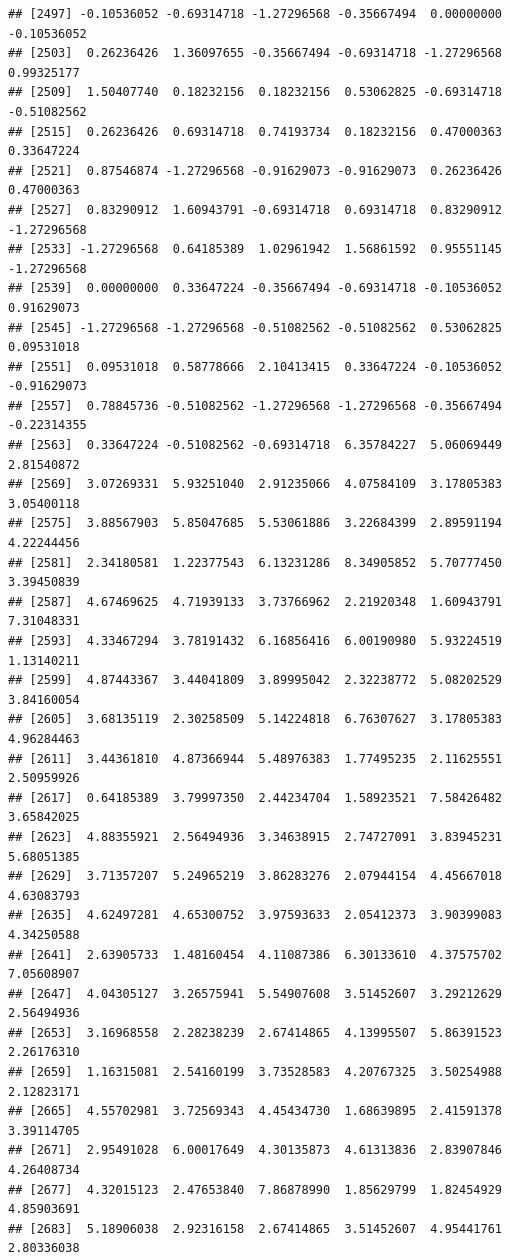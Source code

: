 \documentclass[
]{article}
\begin{document}
\begin{verbatim}
## [2497] -0.10536052 -0.69314718 -1.27296568 -0.35667494  0.00000000 -0.10536052
## [2503]  0.26236426  1.36097655 -0.35667494 -0.69314718 -1.27296568  0.99325177
## [2509]  1.50407740  0.18232156  0.18232156  0.53062825 -0.69314718 -0.51082562
## [2515]  0.26236426  0.69314718  0.74193734  0.18232156  0.47000363  0.33647224
## [2521]  0.87546874 -1.27296568 -0.91629073 -0.91629073  0.26236426  0.47000363
## [2527]  0.83290912  1.60943791 -0.69314718  0.69314718  0.83290912 -1.27296568
## [2533] -1.27296568  0.64185389  1.02961942  1.56861592  0.95551145 -1.27296568
## [2539]  0.00000000  0.33647224 -0.35667494 -0.69314718 -0.10536052  0.91629073
## [2545] -1.27296568 -1.27296568 -0.51082562 -0.51082562  0.53062825  0.09531018
## [2551]  0.09531018  0.58778666  2.10413415  0.33647224 -0.10536052 -0.91629073
## [2557]  0.78845736 -0.51082562 -1.27296568 -1.27296568 -0.35667494 -0.22314355
## [2563]  0.33647224 -0.51082562 -0.69314718  6.35784227  5.06069449  2.81540872
## [2569]  3.07269331  5.93251040  2.91235066  4.07584109  3.17805383  3.05400118
## [2575]  3.88567903  5.85047685  5.53061886  3.22684399  2.89591194  4.22244456
## [2581]  2.34180581  1.22377543  6.13231286  8.34905852  5.70777450  3.39450839
## [2587]  4.67469625  4.71939133  3.73766962  2.21920348  1.60943791  7.31048331
## [2593]  4.33467294  3.78191432  6.16856416  6.00190980  5.93224519  1.13140211
## [2599]  4.87443367  3.44041809  3.89995042  2.32238772  5.08202529  3.84160054
## [2605]  3.68135119  2.30258509  5.14224818  6.76307627  3.17805383  4.96284463
## [2611]  3.44361810  4.87366944  5.48976383  1.77495235  2.11625551  2.50959926
## [2617]  0.64185389  3.79997350  2.44234704  1.58923521  7.58426482  3.65842025
## [2623]  4.88355921  2.56494936  3.34638915  2.74727091  3.83945231  5.68051385
## [2629]  3.71357207  5.24965219  3.86283276  2.07944154  4.45667018  4.63083793
## [2635]  4.62497281  4.65300752  3.97593633  2.05412373  3.90399083  4.34250588
## [2641]  2.63905733  1.48160454  4.11087386  6.30133610  4.37575702  7.05608907
## [2647]  4.04305127  3.26575941  5.54907608  3.51452607  3.29212629  2.56494936
## [2653]  3.16968558  2.28238239  2.67414865  4.13995507  5.86391523  2.26176310
## [2659]  1.16315081  2.54160199  3.73528583  4.20767325  3.50254988  2.12823171
## [2665]  4.55702981  3.72569343  4.45434730  1.68639895  2.41591378  3.39114705
## [2671]  2.95491028  6.00017649  4.30135873  4.61313836  2.83907846  4.26408734
## [2677]  4.32015123  2.47653840  7.86878990  1.85629799  1.82454929  4.85903691
## [2683]  5.18906038  2.92316158  2.67414865  3.51452607  4.95441761  2.80336038

\end{verbatim}
\end{document}
